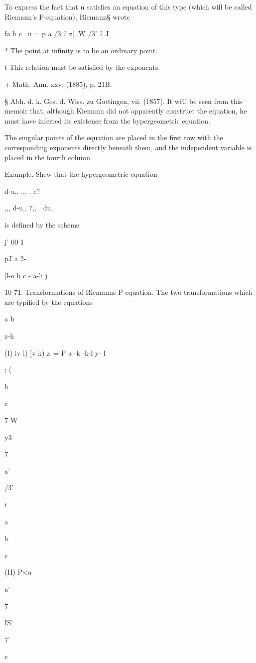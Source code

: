 To express the fact that u satisfies an equation of this type (which
will be called Riemann's P-equation), Riemann§ wrote

fa b c \ u = p a /3 7 z[. W /3' 7 J

* The point at infinity is to be an ordinary point.

t This relation must be satisfied by the exponents.

+ Math. Ann. xxv. (1885), p. 21B.

§ Abh. d. k. Ges. d. Wiss. zu Gottingen, vii. (1857). It wiU be seen
from this memoir that, although Kiemann did not apparently construct
the equation, he must have inferred its existence from the
bypergeometric equation.

%
%

The singular points of the equation are placed in the first row with
the corresponding exponents directly beneath them, and the independent
variable is placed in the fourth column.

Example. Shew that the hypergeometric equation

d-u,, .,, . c?

,,, d-u,, 7,, . du,

is defined by the scheme

j' 00 1 \

pJ a 2-.

[l-o h c - a-h j

10 71. Transformations of Riemanns P-equation. The two transformations
which are typified by the equations

a b

z-h

(I) iv l) [v k) z\ = P a -k -k-l y- l

; (

b

c

7 W

y3

7

a'

/3'

i

a

b

c

(II) P<a

a'



7

IS'

7'

c

